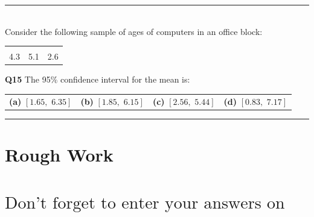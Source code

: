 \documentclass[12pt]{article}
\begin{document}
%





\rule{\linewidth}{1pt}

\quad\\
Consider the following sample of ages of computers in an office block:
\begin{center}
\begin{tabular}{|ccc|}
\hline
&&\\[-0.3cm]
4.3 & 5.1 & 2.6 \\[0.1cm]
\hline
\end{tabular}
\end{center}
{\bf Q15} The 95\% confidence interval for the mean is:\\[0.2cm]
\begin{tabular}{cccc}
{\bf(a)} $[1.65,\,\,6.35]$ & {\bf(b)} $[1.85,\,\,6.15]$ & {\bf(c)} $[2.56,\,\,5.44]$ & {\bf(d)} $[0.83,\,\,7.17]$ \\[0.6cm]
\end{tabular}

\quad

\rule{\linewidth}{1pt}








\newpage

\section*{Rough Work\\[23cm]}
\section*{\hspace{2cm}$\boxed{\text{Don't forget to enter your answers on the last page!}}$}

\newpage
\end{document}
